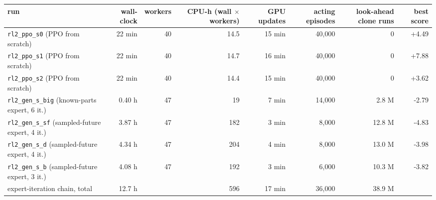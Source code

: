 \begin{tabular}{@{}lrrrrrrr@{}}
\toprule
run & wall-clock & workers & CPU-h (wall $\times$ workers) & GPU updates & acting episodes & look-ahead clone runs & best score \\
\midrule
\texttt{rl2\_ppo\_s0} (PPO from scratch) & 22 min & 40 & 14.5 & 15 min & 40,000 & 0 & +4.49 \\
\texttt{rl2\_ppo\_s1} (PPO from scratch) & 22 min & 40 & 14.7 & 16 min & 40,000 & 0 & +7.88 \\
\texttt{rl2\_ppo\_s2} (PPO from scratch) & 22 min & 40 & 14.4 & 15 min & 40,000 & 0 & +3.62 \\
\midrule
\texttt{rl2\_gen\_s\_big} (known-parts expert, 6 it.) & 0.40 h & 47 & 19 & 7 min & 14,000 & 2.8 M & -2.79 \\
\texttt{rl2\_gen\_s\_sf} (sampled-future expert, 4 it.) & 3.87 h & 47 & 182 & 3 min & 8,000 & 12.8 M & -4.83 \\
\texttt{rl2\_gen\_s\_d} (sampled-future expert, 4 it.) & 4.34 h & 47 & 204 & 4 min & 8,000 & 13.0 M & -3.98 \\
\texttt{rl2\_gen\_s\_b} (sampled-future expert, 3 it.) & 4.08 h & 47 & 192 & 3 min & 6,000 & 10.3 M & -3.82 \\
expert-iteration chain, total & 12.7 h & & 596 & 17 min & 36,000 & 38.9 M & \\
\bottomrule
\end{tabular}
